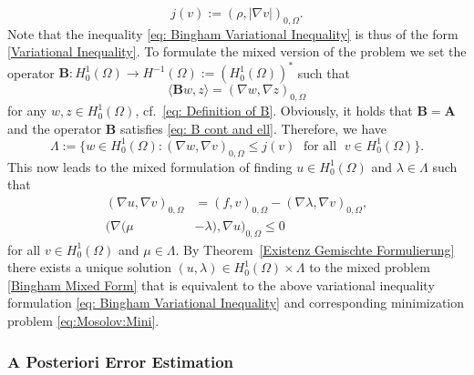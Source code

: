 \documentclass[12pt,twoside,reqno]{amsart}
\theoremstyle{definition}
\numberwithin{equation}{section}
\begin{document}
        \begin{equation*}
            j(v):=(\rho,|\nabla v|)_{0,\Omega}.
        \end{equation*}
        Note that the inequality \eqref{eq: Bingham Variational Inequality} is thus of the form \eqref{Variational Inequality}.
        To formulate the mixed version of the problem we set the operator $\bm{B}:H^1_0(\Omega)\to H^{-1}(\Omega):=(H^1_0(\Omega))^*$ such that
        \begin{equation*}
            \langle \bm{B}w, z\rangle= (\nabla w,\nabla z)_{0,\Omega}
        \end{equation*}
        for any $w,z\in H^1_0(\Omega)$, cf.~\eqref{eq: Definition of B}. Obviously, it holds that $\bm{B}=\bm{A}$ and the operator $\bm{B}$ satisfies \eqref{eq: B cont and ell}. Therefore, we have
        \begin{equation*}%
            \Lambda:=\{w\in H^1_0(\Omega): (\nabla w, \nabla v)_{0,\Omega}\leq j(v)\;\text{ for all }\; v\in H^1_0(\Omega)\}.
        \end{equation*}
        This now leads to the mixed formulation of finding $u\in H^1_0(\Omega)$ and $\lambda\in \Lambda$ such that
        \begin{subequations}\label{Bingham Mixed Form}
            \begin{align}
                (\nabla u,\nabla v)_{0,\Omega} &= (f,v)_{0,\Omega}-(\nabla\lambda,\nabla v)_{0,\Omega},\\
                (\nabla (\mu&-\lambda), \nabla u)_{0,\Omega}\leq 0
            \end{align}
        \end{subequations}
        for all $v\in H^1_0(\Omega)$ and $\mu\in \Lambda$. By Theorem~\ref{Existenz Gemischte Formulierung} there exists a unique solution $(u,\lambda)\in H^1_0(\Omega)\times\Lambda$ to the mixed problem \eqref{Bingham Mixed Form} that is equivalent to the above variational inequality formulation \eqref{eq: Bingham Variational Inequality} and corresponding minimization problem \eqref{eq:Mosolov:Mini}.

       
        

        \subsubsection{A Posteriori Error Estimation} \label{sec:Mosolov:Apost}
        
\end{document}
